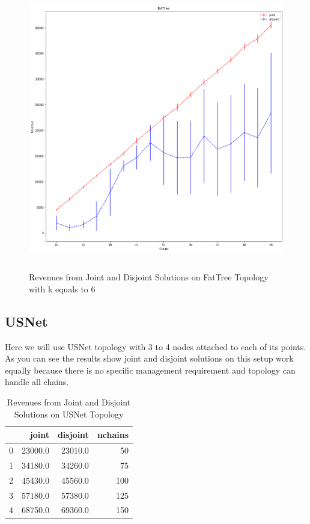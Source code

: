 \begin{figure}[H]
    \centering
    \includegraphics[height=350pt]{plots/joint-vs-disjoint-fattree.png}
    \caption{Revenues from Joint and Disjoint Solutions on FatTree Topology with k equals to 6}
    \label{fig:joint-vs-disjoint-fattree}
\end{figure}

\subsection{USNet}
Here we will use USNet topology with 3 to 4 nodes attached to each of its points.
As you can see the results show joint and disjoint solutions on this setup work equally because there is no specific
management requirement and topology can handle all chains.

\begin{table}[H]
    \caption{Revenues from Joint and Disjoint Solutions on USNet Topology}
    \label{tbl:joint-vs-disjoin-usnet-1}
    \medskip
    \centering
    \begin{tabular}{lrrr}
        \toprule
        {} &    joint &  disjoint &  nchains \\
        \midrule
        0 &  23000.0 &   23010.0 &       50 \\
        1 &  34180.0 &   34260.0 &       75 \\
        2 &  45430.0 &   45560.0 &      100 \\
        3 &  57180.0 &   57380.0 &      125 \\
        4 &  68750.0 &   69360.0 &      150 \\
        \bottomrule
    \end{tabular}
\end{table}

